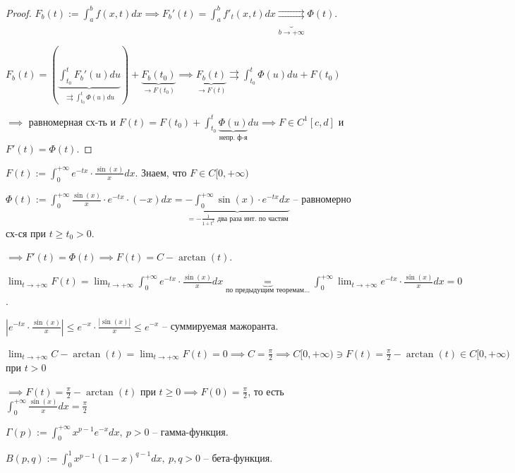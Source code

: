 \begin{proof}
    $F_b(t) := \int_{a}^{b} { f(x, t) dx } \implies F_b'(t) = \int_{a}^{b} { f'_t (x, t) dx } \underbrace{\rightrightarrows}_{b \rightarrow +\infty} \Phi(t)$.

    $F_b(t) = \left(\underbrace{\int_{t_0}^{t} { F_b'(u) du }}_{\rightrightarrows \int_{t_0}^{t} { \Phi(u) du }}\right) + \underbrace{F_b(t_0)}_{\rightarrow F(t_0)} \implies \underbrace{F_b(t)}_{\rightarrow F(t)} \rightrightarrows \int_{t_0}^{t} { \Phi(u) du } + F(t_0)$

    $\implies$ равномерная сх-ть и $F(t) = F(t_0) + \int_{t_0}^{t} { \underbrace{\Phi(u)}_{\text{непр. ф-я}} du } \implies F \in C^1[c, d]$ и $F'(t) = \Phi(t)$.
\end{proof}

\begin{example}
    $F(t) := \int_{0}^{+\infty} { e^{-tx} \cdot \frac{\sin(x)}{x} dx }$. Знаем, что $F \in C[0, +\infty)$

    $\Phi(t) := \int_{0}^{+\infty} { \frac{\sin(x)}{x} \cdot e^{-tx} \cdot (-x) dx } = \underbrace{- \int_{0}^{+\infty} { \sin(x) \cdot e^{-tx} dx }}_{= - \frac{1}{1+t^2} \text{ два раза инт. по частям}}$ -- равномерно сх-ся при $t \geq t_0 > 0$.

    $\implies F'(t) = \Phi(t) \implies F(t) = C - \arctan(t)$.

    $\lim_{t \rightarrow + \infty} { F(t) } = \lim_{t \rightarrow +\infty} { \int_{0}^{+\infty} { e^{-tx} \cdot \frac{\sin(x)}{x} dx} } \underbrace{=}_{\text{по предыдущим теоремам...}} \int_{0}^{+\infty} { \lim_{t \rightarrow +\infty} { e^{-tx} \cdot \frac{\sin(x)}{x} dx } } = 0$.

    $\left| e^{-tx} \cdot \frac{\sin(x)}{x} \right| \leq e^{-x} \cdot \frac{|\sin(x)|}{x} \leq e^{-x}$ -- суммируемая мажоранта.

    $\lim_{t \rightarrow +\infty}{ C - \arctan(t) } = \lim_{t \rightarrow +\infty} { F(t) } = 0 \implies C = \frac{\pi}{2} \implies C[0, +\infty) \ni F(t) = \frac{\pi}{2} - \arctan(t) \in C[0, +\infty)$ при $t > 0$

    $\implies F(t) = \frac{\pi}{2} - \arctan(t)$ при $t \geq 0 \implies F(0) = \frac{\pi}{2}$, то есть $\int_{0}^{+\infty} { \frac{\sin(x)}{x} dx } = \frac{\pi}{2}$
\end{example}


\begin{definition}
    $\Gamma(p) := \int_{0}^{+\infty} { x^{p-1} e^{-x} dx }, \ p > 0$ -- гамма-функция.

    $B(p, q) := \int_{0}^{1} { x^{p-1} (1-x)^{q-1} dx }, \ p, q > 0$ -- бета-функция.
\end{definition}


